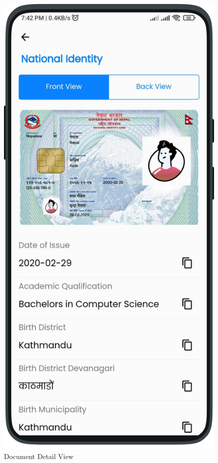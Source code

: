 \begin{multicols}{2}
\begin{figure}[H]
        \includegraphics[width=0.6\linewidth]{images/results/mobile/NationalIdentity.png}
        \caption[Document Detail View ]{Document Detail View}
        \label{fig:NationalIdentity.png}
        \end{figure}     
\end{multicols}


